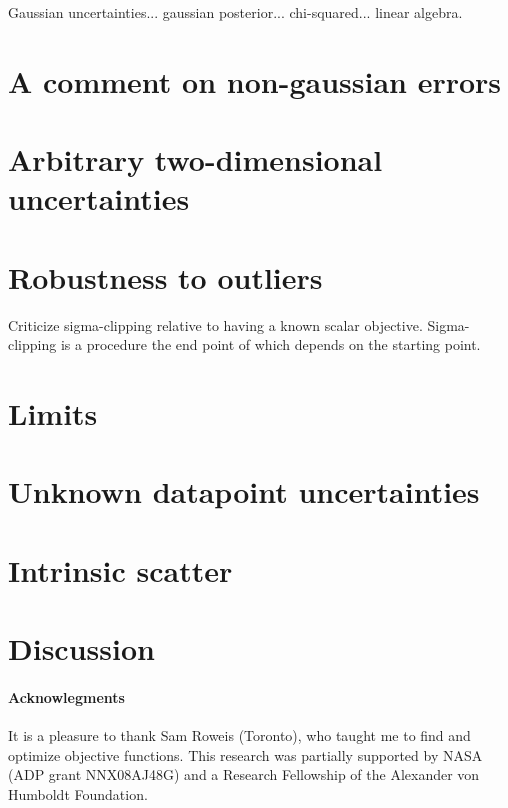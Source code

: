 \documentclass[12pt]{article}
\begin{document}
Gaussian uncertainties... gaussian posterior... chi-squared... linear
algebra.

\section{A comment on non-gaussian errors}

\section{Arbitrary two-dimensional uncertainties}

\section{Robustness to outliers}

Criticize sigma-clipping relative to having a known scalar objective.
Sigma-clipping is a procedure the end point of which depends on the
starting point.

\section{Limits}

\section{Unknown datapoint uncertainties}

\section{Intrinsic scatter}

\section{Discussion}

\paragraph{Acknowlegments}
It is a pleasure to thank Sam Roweis (Toronto), who taught me to find
and optimize objective functions.  This research was partially
supported by NASA (ADP grant NNX08AJ48G) and a Research Fellowship of
the Alexander von Humboldt Foundation.
\end{document}
